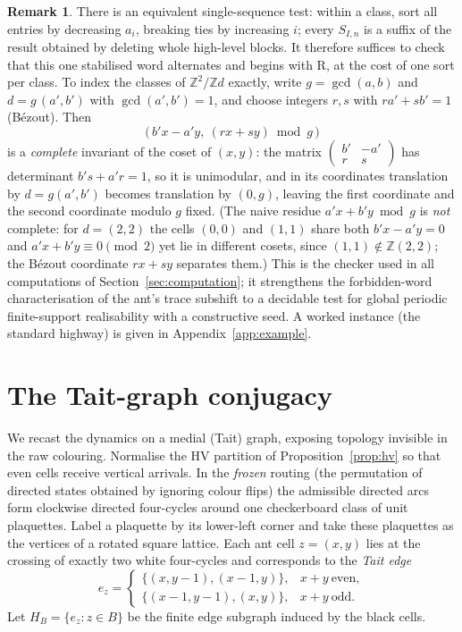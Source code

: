 \documentclass[11pt,letterpaper]{article}
\theoremstyle{plain}
\theoremstyle{definition}
\newtheorem{remark}[theorem]{Remark}
\newcommand{\Z}{\mathbb{Z}}
\newcommand{\drift}{d}
\newcommand{\turnR}{\mathrm{R}}
\begin{document}
\begin{NoHyper}
\begin{remark}\label{rem:onesort}
There is an equivalent single-sequence test: within a class, sort all entries by
decreasing $a_i$, breaking ties by increasing $i$; every $S_{I,n}$ is a suffix of the
result obtained by deleting whole high-level blocks. It therefore suffices to check
that this one stabilised word alternates and begins with $\turnR$, at the cost of one
sort per class. To index the classes of $\Z^2/\Z\drift$ exactly, write
$g=\gcd(a,b)$ and $\drift=g\,(a',b')$ with $\gcd(a',b')=1$, and choose integers $r,s$
with $r a'+s b'=1$ (B\'ezout). Then
\[
\bigl(\,b'x-a'y,\ (r x+s y)\bmod g\,\bigr)
\]
is a \emph{complete} invariant of the coset of $(x,y)$: the matrix
$\left(\begin{smallmatrix} b'&-a'\\ r&s\end{smallmatrix}\right)$ has determinant
$b's+a'r=1$, so it is unimodular, and in its coordinates translation by
$\drift=g(a',b')$ becomes translation by $(0,g)$, leaving the first coordinate and the
second coordinate modulo $g$ fixed. (The naive residue $a'x+b'y\bmod g$ is
\emph{not} complete: for $\drift=(2,2)$ the cells $(0,0)$ and $(1,1)$ share both
$b'x-a'y=0$ and $a'x+b'y\equiv0\pmod2$ yet lie in different cosets, since
$(1,1)\notin\Z(2,2)$; the B\'ezout coordinate $rx+sy$ separates them.) This is the
checker used in all computations
of Section~\ref{sec:computation}; it strengthens the
forbidden-word characterisation of the ant's trace subshift
\cite{Gajardo2003symbolic} to a decidable test for global periodic finite-support
realisability with a constructive seed. A worked instance (the standard highway) is
given in Appendix~\ref{app:example}.
\end{remark}

\section{The Tait-graph conjugacy}\label{sec:tait}

We recast the dynamics on a medial (Tait) graph, exposing topology invisible in the
raw colouring. Normalise the HV partition of Proposition~\ref{prop:hv} so that
even cells receive vertical arrivals. In the \emph{frozen} routing (the permutation
of directed states obtained by ignoring colour flips) the admissible directed arcs
form clockwise directed four-cycles around one checkerboard class of unit plaquettes.
Label a plaquette by its lower-left corner and take these plaquettes as the vertices
of a rotated square lattice. Each ant cell $z=(x,y)$ lies at the crossing of exactly
two white four-cycles and corresponds to the \emph{Tait edge}
\begin{equation}\label{eq:tait}
e_z=\begin{cases}\{(x,y-1),(x-1,y)\}, & x+y\ \text{even},\\[2pt]
\{(x-1,y-1),(x,y)\}, & x+y\ \text{odd}.\end{cases}
\end{equation}
Let $H_B=\{e_z:z\in B\}$ be the finite edge subgraph induced by the black cells.


\end{NoHyper}
\end{document}
